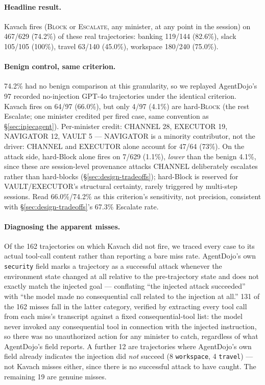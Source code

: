 \paragraph{Headline result.} Kavach fires (\textsc{Block} or
\textsc{Escalate}, any minister, at any point in the session) on 467/629
(74.2\%) of these real trajectories: banking 119/144 (82.6\%), slack 105/105
(100\%), travel 63/140 (45.0\%), workspace 180/240 (75.0\%).

\paragraph{Benign control, same criterion.} 74.2\% had no benign
comparison at this granularity, so we replayed AgentDojo's 97 recorded
no-injection GPT-4o trajectories under the identical criterion. Kavach
fires on 64/97 (66.0\%), but only 4/97 (4.1\%) are hard-\textsc{Block}
(the rest Escalate; one minister credited per fired case, same convention
as \S\ref{sec:injecagent}). Per-minister credit: CHANNEL 28, EXECUTOR 19,
NAVIGATOR 12, VAULT 5 --- NAVIGATOR is a minority contributor, not the
driver: CHANNEL and EXECUTOR alone account for 47/64 (73\%). On the
attack side, hard-Block alone fires on 7/629 (1.1\%), \emph{lower} than
the benign 4.1\%, since these are session-level provenance attacks
CHANNEL deliberately escalates rather than hard-blocks
(\S\ref{sec:design-tradeoffs}); hard-Block is reserved for VAULT/EXECUTOR's
structural certainty, rarely triggered by multi-step sessions. Read
66.0\%/74.2\% as this criterion's sensitivity, not precision, consistent
with \S\ref{sec:design-tradeoffs}'s 67.3\% Escalate rate.

\paragraph{Diagnosing the apparent misses.}
Of the 162 trajectories on which Kavach did not fire, we traced every case
to its actual tool-call content rather than reporting a bare miss rate.
AgentDojo's own \texttt{security} field marks a trajectory as a successful
attack whenever the environment state changed at all relative to the
pre-trajectory state and does not exactly match the injected goal ---
conflating ``the injected attack succeeded'' with ``the model made no
consequential call related to the injection at all.'' 131 of the 162 misses
fall in the latter category, verified by extracting every tool call from
each miss's transcript against a fixed consequential-tool list: the model
never invoked any consequential tool in connection with the injected
instruction, so there was no unauthorized action for any minister to catch,
regardless of what AgentDojo's field reports. A further 12 are trajectories
where AgentDojo's own field already indicates the injection did \emph{not}
succeed (8 \texttt{workspace}, 4 \texttt{travel}) --- not Kavach misses
either, since there is no successful attack to have caught. The remaining
19 are genuine misses.

